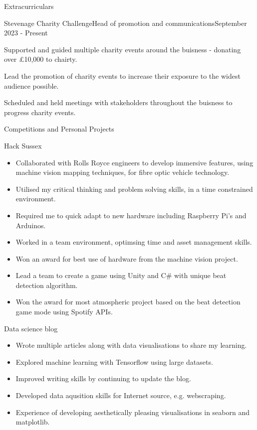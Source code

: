 \documentclass[a4paper]{article}
\newlength{\tabin}
\newlength{\secsep}
\newcommand{\lineunder}{\vspace*{-8pt} \\ \hspace*{-6pt} \hrulefill \\ \vspace*{-15pt}}
\newenvironment{tabbedsection}[1]{
  \begin{list}{}{
      \setlength{\itemsep}{0pt}
      \setlength{\labelsep}{0pt}
      \setlength{\labelwidth}{0pt}
      \setlength{\leftmargin}{\tabin}
      \setlength{\rightmargin}{\tabin}
      \setlength{\listparindent}{0pt}
      \setlength{\parsep}{0pt}
      \setlength{\parskip}{0pt}
      \setlength{\partopsep}{0pt}
      \setlength{\topsep}{#1}
    }
  \item[]
}{\end{list}}
\newenvironment{resume_section}[1]{
  \filbreak
  \vspace{2\secsep}
  \textsc{\large#1}
  \lineunder
  \begin{tabbedsection}{\secsep}
}{\end{tabbedsection}}
\newenvironment{resume_subsection}[2][]{
  \textbf{#2} \hfill {\footnotesize #1} \hspace{2em}
  \begin{tabbedsection}{0.5\secsep}
}{\end{tabbedsection}}
\newenvironment{resume_employer}[4]{
  \vspace{\secsep}
  \textbf{#1} \\ 
  \indent {\small #2} \hfill {\footnotesize#3 (#4)}
  \begin{tabbedsection}{0pt}
  \begin{subitems}
}{\end{subitems}\end{tabbedsection}}
\newenvironment{subitems}{
  \renewcommand{\labelitemi}{-}
  \begin{itemize}
      \setlength{\labelsep}{1em}
}{\end{itemize}}
\begin{document}
\begin{resume_section}{Extracurriculars}
  \begin{resume_employer}{Stevenage Charity Challenge}{Head of promotion and communications}{}{September 2023 - Present}
    \item Supported and guided multiple charity events around the buisness - donating over £10,000 to chairty.
    \item Lead the promotion of charity events to increase their exposure to the widest audience possible.
    \item Scheduled and held meetings with stakeholders throughout the buisness to progress charity events.
  \end{resume_employer}
\end{resume_section}

\begin{resume_section}{Competitions and Personal Projects}
  \begin{resume_subsection}[(November 2018 \& 2019)]{Hack Sussex}
    \begin{subitems}
    \item Collaborated with Rolls Royce engineers to develop immersive features, using machine vision mapping techniques, for fibre optic vehicle technology. 
    \item Utilised my critical thinking and problem solving skills, in a time constrained environment.
    \item Required me to quick adapt to new hardware including Raspberry Pi's and Arduinos.
    \item Worked in a team environment, optimsing time and asset management skills.
    \item Won an award for best use of hardware from the machine vision project.
    \item Lead a team to create a game using Unity and C\# with unique beat detection algorithm.
    \item Won the award for most atmospheric project based on the beat detection game mode using Spotify APIs.
    \end{subitems}
  \end{resume_subsection}

    \begin{resume_subsection}{Data science blog}
    \begin{subitems}
        \item Wrote multiple articles along with data visualisations to share my learning.
        \item Explored machine learning with Tensorflow using large datasets.
        \item Improved writing skills by continuing to update the blog.
        \item Developed data aqusition skills for Internet source, e.g. webscraping.
        \item Experience of developing aesthetically pleasing visualisations in seaborn and matplotlib.
    \end{subitems}
  \end{resume_subsection}
  

\end{resume_section}
\end{document}
